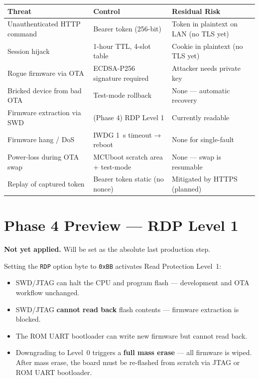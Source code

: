 \documentclass[11pt,a4paper]{article}
\begin{document}
\begin{longtable}{@{}p{4cm}p{3.5cm}p{5cm}@{}}
\toprule
\textbf{Threat} & \textbf{Control} & \textbf{Residual Risk} \\
\midrule
\endhead
Unauthenticated HTTP command & Bearer token (256-bit) & Token in plaintext on LAN (no TLS yet) \\
Session hijack & 1-hour TTL, 4-slot table & Cookie in plaintext (no TLS yet) \\
Rogue firmware via OTA & ECDSA-P256 signature required & Attacker needs private key \\
Bricked device from bad OTA & Test-mode rollback & None — automatic recovery \\
Firmware extraction via SWD & (Phase 4) RDP Level 1 & Currently readable \\
Firmware hang / DoS & IWDG 1~s timeout → reboot & None for single-fault \\
Power-loss during OTA swap & MCUboot scratch area + test-mode & None — swap is resumable \\
Replay of captured token & Bearer token static (no nonce) & Mitigated by HTTPS (planned) \\
\bottomrule
\end{longtable}

\section{Phase 4 Preview — RDP Level 1}

\textbf{Not yet applied.} Will be set as the absolute last production step.

Setting the \texttt{RDP} option byte to \texttt{0xBB} activates Read Protection Level~1:

\begin{itemize}[nosep]
\item SWD/JTAG can halt the CPU and program flash — development and OTA workflow unchanged.
\item SWD/JTAG \textbf{cannot read back} flash contents — firmware extraction is blocked.
\item The ROM UART bootloader can write new firmware but cannot read back.
\item Downgrading to Level~0 triggers a \textbf{full mass erase} — all firmware is wiped.
      After mass erase, the board must be re-flashed from scratch via JTAG or ROM UART bootloader.
\end{itemize}
\end{document}
